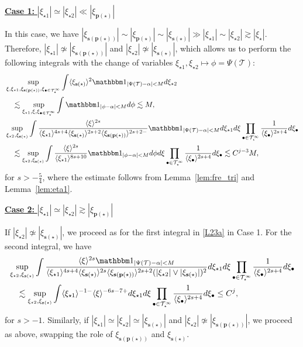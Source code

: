\documentclass[a4paper,
11pt,  reqno]{amsart}
\newcommand{\jap}[1]{\langle #1 \rangle}
\newcommand{\5}{\textup{V}}
\newcommand{\noi}{\noindent}
\newcommand{\ind}{\mathbbm 1}
\newcommand{\les}{\lesssim}
\theoremstyle{remark}
\newcommand{\bul}{\bullet}
\newcommand{\TT}{\mathcal{T}}
\newcommand{\al}{\alpha}
\newcommand{\pb}{\mathbf{p}}
\newcommand{\sbf}{\mathbf{s}}
\newcommand{\ges}{\gtrsim}
\newcommand{\jb}[1]
{\langle #1 \rangle}
\numberwithin{equation}{section}
\numberwithin{theorem}{section}
\begin{document}
\smallskip
\noi
\underline{\textbf{Case 1:} $|\xi_{\star1}| \simeq |\xi_{\star2}| \ll |\xi_{\pb(\star)}|$}

In this case, we have $|\xi_{\sbf(\pb(\star))}| \sim |\xi_{\pb(\star)}| \sim |\xi_{\sbf(\star)}| \gg |\xi_{\star1}| \sim |\xi_{\star2}| \ges |\xi_\star|$.
Therefore, $|\xi_{\star1}| \not \simeq |\xi_{\sbf(\pb(\star))}| $ and $|\xi_{\star2}| \not \simeq |\xi_{\sbf(\star)}|$, which allows us to perform the following integrals with the change of variables $\xi_{\star1}, \xi_{\star2} \mapsto \phi = \Psi(\TT)$:
\begin{align}\label{L23a}
    & \sup_{ \xi,\xi_{\star1}, \xi_{\sbf(\pb(\star))},  \xi_{\bul\in \TT^\infty_\star}} 
    \int 
    \jb{\xi_{\sbf(\star)}}^2 
    \ind_{|\Psi(\TT)-\al|< M } 
    d\xi_{\star2} 
    \\
    &
    \quad 
    \les 
    \sup_{\xi_{\star1}, \xi, \xi_{\bul\in \TT^\infty_\star}} 
    \int 
    \ind_{|\phi-\al|  < M} d\phi 
    \les M
    , 
    \\
    &
    \sup_{\xi_{\star2}, \xi_{\sbf(\star)}} 
    \int 
    \frac{\jb{\xi}^{2s}   }{ \jb{\xi_{\star1}}^{4s+4} \jb{\xi_{\sbf(\star)}}^{2s+2} \jb{\xi_{\sbf(\pb(\star))}}^{2s+2-} }
    \ind_{|\Psi(\TT)-\al|< M } 
    d\xi_{\star1} d\xi 
    \prod_{\bul\in\TT^\infty_\star} \frac{1}{\jb{\xi_\bul}^{2s+4}} d\xi_\bul
    \\
    &
    \quad 
    \les 
    \sup_{\xi_{\star2}, \xi_{\sbf(\star)}} 
    \int { \frac{\jb{\xi}^{2s}}{\jap{\xi_{\star1}}^{8s+10}} }\ind_{|\phi-\al|< M} d\phi d\xi \prod_{\bul\in\TT^\infty_\star} \frac{1}{\jb{\xi_\bul}^{2s+4}} d\xi_\bul
    \les C^{j-3 } M 
    ,
\end{align}
for $s>-\frac54$, where the estimate follows from Lemma~\ref{lem:fre_tri} and Lemma~\ref{lem:eta1}.


\smallskip
\noi
\underline{\textbf{Case 2:} $|\xi_{\star1}| \simeq |\xi_{\star2}| \ges |\xi_{\pb(\star)}|$}

If $|\xi_{\star2}| \not\simeq |\xi_{\sbf(\star)}|$, we proceed as for the first integral in \eqref{L23a} in Case 1. For the second integral, we have
\begin{align}\label{L23b}
&
    \sup_{\xi_{\star2}, \xi_{\sbf(\star)}} 
    \int 
    \frac{\jb{\xi}^{2s} \ind_{|\Psi(\TT)-\al|< M }   }{ \jb{\xi_{\star1}}^{4s+4} \jb{\xi_{\sbf(\star)}}^{2s} \jb{\xi_{\sbf(\pb(\star))}}^{2s+2} (|\xi_{\star2}| \lor |\xi_{\sbf(\star)}|)^2  }
    d\xi_{\star1} d\xi 
    \prod_{\bul\in\TT^\infty_\star} \frac{1}{\jb{\xi_\bul}^{2s+4}} d\xi_\bul
    \\
    &
    \quad 
    \les 
    \sup_{\xi_{\star2}, \xi_{\sbf(\star)}} 
    \int \jb{\xi_{\star1}}^{-1-} \jb{\xi}^{-6s-7+} d\xi_{\star1} d\xi \prod_{\bul\in\TT^\infty_\star} \frac{1}{\jb{\xi_\bul}^{2s+4}} d\xi_\bul
    \le C^{j} , 
\end{align}
for $s> -1$. 
Similarly, if $|\xi_{\star1}| \simeq |\xi_{\star2}| \simeq |\xi_{\sbf(\star)}|$ and $|\xi_{\star2}| \not\simeq |\xi_{\sbf(\pb(\star))}|$, we proceed as above, swapping the role of $\xi_{\sbf(\pb(\star))}$ and $\xi_{\sbf(\star)}$. 
\end{document}
